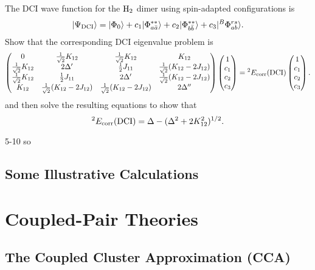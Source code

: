 \documentclass[a4paper]{book}
\newcounter{exercise}[chapter]
\newcounter{solution}[chapter]
\newcommand{\corr}{{\rm corr}}
\newcommand{\DCI}{{\rm DCI}}
\begin{document}
	\begin{exercise}
	The DCI wave function for the $\ce{H2}$ dimer using spin-adapted configurations is
	\[
		| \Psi_{\DCI} \rangle = | \Phi_0 \rangle + c_1 | \Phi^{**}_{a\bar{a}} \rangle + c_2 | \Phi^{**}_{b \bar{b}} \rangle + c_3 | {}^{B}\Phi^{rs}_{ab} \rangle .
	\]
	Show that the corresponding DCI eigenvalue problem is
	\[
	\begin{pmatrix}
		0 & \frac{1}{\sqrt{2}}K_{12} & \frac{1}{\sqrt{2}} K_{12} & K_{12} \\
		\frac{1}{\sqrt{2}}K_{12} & 2\Delta^\prime & \frac{1}{2}J_{11} & \frac{1}{\sqrt{2}}(K_{12} - 2 J_{12}) \\
		\frac{1}{\sqrt{2}}K_{12} & \frac{1}{2}J_{11} & 2\Delta^\prime & \frac{1}{\sqrt{2}}(K_{12} - 2 J_{12}) \\
		K_{12} & \frac{1}{\sqrt{2}}(K_{12} - 2J_{12}) & \frac{1}{\sqrt{2}}(K_{12} - 2J_{12}) & 2\Delta^{\prime\prime}
	\end{pmatrix} \begin{pmatrix}
	1 \\ c_1 \\ c_2 \\ c_3
	\end{pmatrix} = {}^2 E_\corr (\DCI) \begin{pmatrix}
	1 \\ c_1 \\ c_2 \\ c_3
	\end{pmatrix}.
	\]
	and then solve the resulting equations to show that
	\[
		{}^2 E_\corr (\DCI) = \Delta - ( \Delta^2 + 2 K^2_{12} )^{1/2}.
	\]
	\end{exercise}
	
	\begin{solution}
		5-10 so
	\end{solution}
	
	\subsection{Some Illustrative Calculations}
	
	\section{Coupled-Pair Theories}
	
	\subsection{The Coupled Cluster Approximation (CCA)}
	
\end{document}
